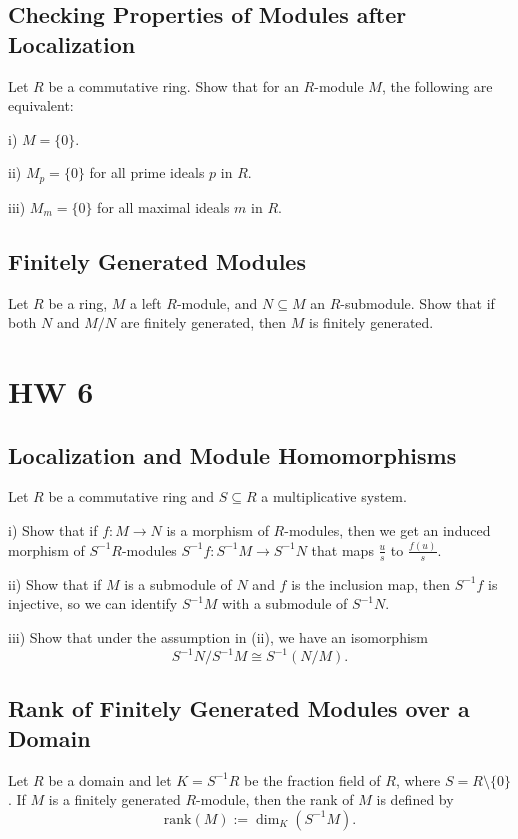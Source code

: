 \documentclass[lang=cn,11pt]{template}
\begin{document}
\section{Checking Properties of Modules after Localization}
Let \( R \) be a commutative ring. Show that for an \( R \)-module \( M \), the following are equivalent:

i) \( M = \{0\} \).

ii) \( M_p = \{0\} \) for all prime ideals \( p \) in \( R \).

iii) \( M_m = \{0\} \) for all maximal ideals \( m \) in \( R \).

\section{Finitely Generated Modules}
Let \( R \) be a ring, \( M \) a left \( R \)-module, and \( N \subseteq M \) an \( R \)-submodule. Show that if both \( N \) and \( M/N \) are finitely generated, then \( M \) is finitely generated.







\chapter{HW 6}

\section{Localization and Module Homomorphisms}
Let \( R \) be a commutative ring and \( S \subseteq R \) a multiplicative system.

i) Show that if \( f : M \rightarrow N \) is a morphism of \( R \)-modules, then we get an induced morphism of \( S^{-1}R \)-modules \( S^{-1}f : S^{-1}M \rightarrow S^{-1}N \) that maps \( \frac{u}{s} \) to \( \frac{f(u)}{s} \).

ii) Show that if \( M \) is a submodule of \( N \) and \( f \) is the inclusion map, then \( S^{-1}f \) is injective, so we can identify \( S^{-1}M \) with a submodule of \( S^{-1}N \).

iii) Show that under the assumption in (ii), we have an isomorphism
\[
S^{-1}N / S^{-1}M \cong S^{-1}(N/M).
\]

\section{Rank of Finitely Generated Modules over a Domain}
Let \( R \) be a domain and let \( K = S^{-1}R \) be the fraction field of \( R \), where \( S = R \setminus \{0\} \). If \( M \) is a finitely generated \( R \)-module, then the rank of \( M \) is defined by
\[
\text{rank}(M) := \dim_K(S^{-1}M).
\]
\end{document}
